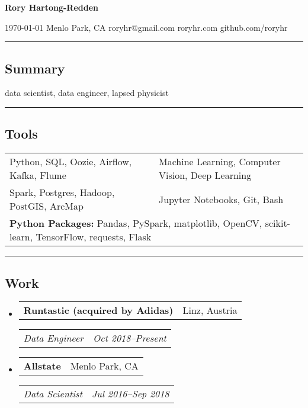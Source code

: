 \documentclass[10pt,letterpaper]{article}
\makeatletter
\newenvironment{indentsection}[1]
{\begin{list}{}%
	{\setlength{\leftmargin}{#1}}
	\item[]%
}
{\end{list}}
\newcommand{\headerrow}[2]{
\begin{tabular*}{\linewidth}{l@{\extracolsep{\fill}}r}
		#1 &
		#2 \\
	\end{tabular*}
}
\newcommand{\jobitem}[4]{\item \headerrow{\textbf{#1}}{#2}
\headerrow{\emph{#3}}{\emph{#4}}}
\makeatother
\begin{document}
{\raggedright \LARGE \bf Rory Hartong-Redden\\}

{\raggedleft 
\today \/ \textbar
\/ Menlo Park, CA \textbar
\/ roryhr@gmail.com \textbar
\/ roryhr.com \textbar\/   
github.com/roryhr\\
}
\hrule

\subsection*{Summary}
\begin{centering}  
data scientist, data engineer, lapsed physicist\\
\end{centering}

\hrule
\subsection*{Tools}
\begin{indentsection}{\parindent}
\begin{tabular}{p{0.5\linewidth}   p{0.5\linewidth}} 
	Python, SQL, Oozie, Airflow, Kafka, Flume
	& Machine Learning, Computer Vision, Deep Learning \\

	Spark, Postgres, Hadoop, PostGIS, ArcMap 
	& Jupyter Notebooks, Git, Bash \\ 
	
	\multicolumn{2}{l}{
		\textbf{Python Packages:} Pandas, PySpark, matplotlib, OpenCV, scikit-learn,
							TensorFlow, requests, Flask} \\
\end{tabular}
\end{indentsection}

\hrule
\subsection*{Work}
\begin{itemize}
	\jobitem{Runtastic (acquired by Adidas)}{Linz, Austria}
		     {Data Engineer}{Oct 2018--Present}
\end{itemize}

\begin{itemize}
	\jobitem{Allstate}{Menlo Park, CA}
		     {Data Scientist}{Jul 2016--Sep 2018}
\end{itemize}
\end{document}
